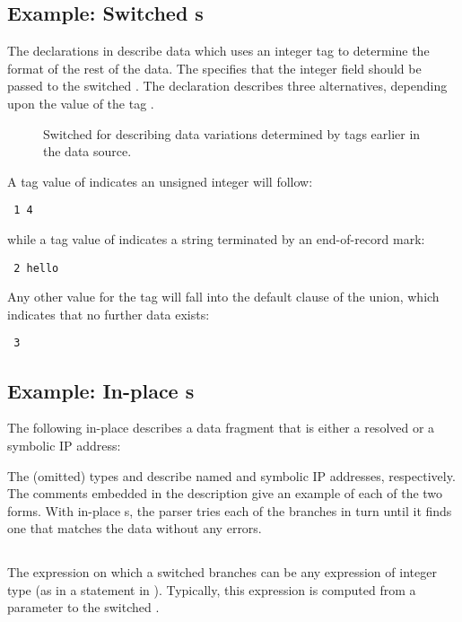 \subsection{Example: Switched \Punion{}s}
The \pads{} declarations in  describe data
which uses an integer tag to determine the format of the rest of the
data. 
The \Pstruct{}  specifies that the integer field 
should be passed to the switched \Punion{} .   
The  declaration describes three alternatives, depending
upon the value of the tag .  
%
\begin{figure}

\caption{Switched \Punion{} for describing data variations determined
  by tags earlier in the data source.}
\label{fig:switched-union}
\end{figure}
%
A tag value of  indicates an unsigned integer will follow:
\begin{verbatim}
 1 4
\end{verbatim}%
while a tag
value of  indicates a string terminated by an end-of-record
mark:  
\begin{verbatim}
 2 hello
\end{verbatim}%
Any other value for the tag will fall into the default clause of the
union, which indicates that no further data
exists:
\begin{verbatim}
 3
\end{verbatim}%

\subsection{Example: In-place \Punion{}s}
The following in-place \Punion{} describes a data fragment that is
either a resolved or a symbolic IP address:

The (omitted) types  and  describe named and symbolic
IP addresses, respectively.
The comments embedded in the description give an example of each of the two
forms.   With in-place \Punion{}s, the parser tries each of the branches
in turn until it finds one that matches the data without any errors.

\subsection{\Pswitch{}}
The expression on which a switched \Punion{} branches can be any \C{}
expression of integer type (as in a  statement in \C{}).
Typically, this expression is computed from a parameter to the
switched \Punion{}.

